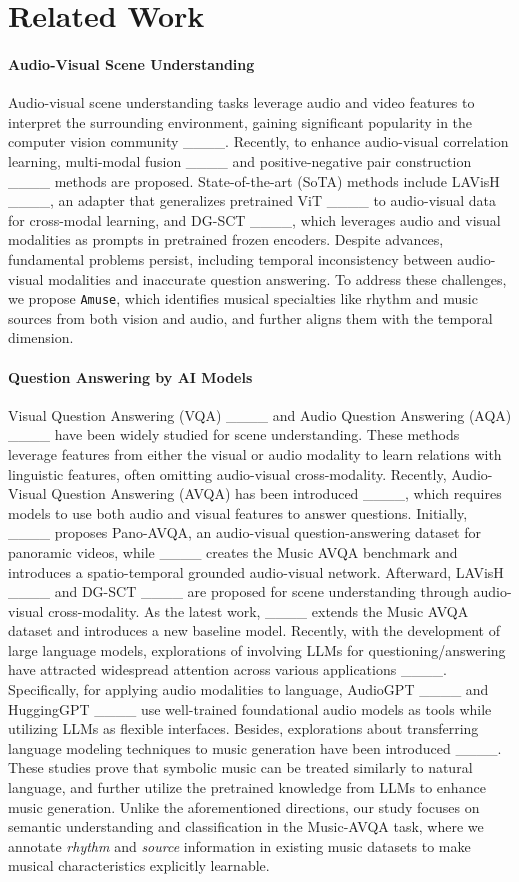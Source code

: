 \section{Related Work}
\paragraph{Audio-Visual Scene Understanding}
Audio-visual scene understanding tasks leverage audio and video features to interpret the surrounding environment, gaining significant popularity in the computer vision community ____. Recently, to enhance audio-visual correlation learning, multi-modal fusion ____ and positive-negative pair construction ____ methods are proposed. State-of-the-art (SoTA) methods include LAVisH ____, an adapter that generalizes pretrained ViT ____ to audio-visual data for cross-modal learning, and DG-SCT ____, which leverages audio and visual modalities as prompts in pretrained frozen encoders.
Despite advances, fundamental problems persist, including temporal inconsistency between audio-visual modalities and inaccurate question answering. To address these challenges, we propose \texttt{Amuse}, which identifies musical specialties like rhythm and music sources from both vision and audio, and further aligns them with the temporal dimension.


\paragraph{Question Answering by AI Models}
Visual Question Answering (VQA) ____ and Audio Question Answering (AQA) ____ have been widely studied for scene understanding. These methods leverage features from either the visual or audio modality to learn relations with linguistic features, often omitting audio-visual cross-modality. Recently, Audio-Visual Question Answering (AVQA) has been introduced ____, which requires models to use both audio and visual features to answer questions. Initially, ____ proposes Pano-AVQA, an audio-visual question-answering dataset for panoramic videos, while ____ creates the Music AVQA benchmark and introduces a spatio-temporal grounded audio-visual network. Afterward, LAVisH ____ and DG-SCT ____ are proposed for scene understanding through audio-visual cross-modality. As the latest work, ____ extends the Music AVQA dataset and introduces a new baseline model. Recently, with the development of large language models, explorations of involving LLMs for questioning/answering have attracted widespread attention across various applications ____. Specifically, for applying audio modalities to language, AudioGPT ____ and HuggingGPT ____ use well-trained foundational audio models as tools while utilizing LLMs as flexible interfaces. Besides, explorations about transferring language modeling techniques to music generation have been introduced ____. These studies prove that symbolic music can be treated similarly to natural language, and further utilize the pretrained knowledge from LLMs to enhance music generation. Unlike the aforementioned directions, our study focuses on semantic understanding and classification in the Music-AVQA task, where we annotate \textit{rhythm} and \textit{source} information in existing music datasets to make musical characteristics explicitly learnable.